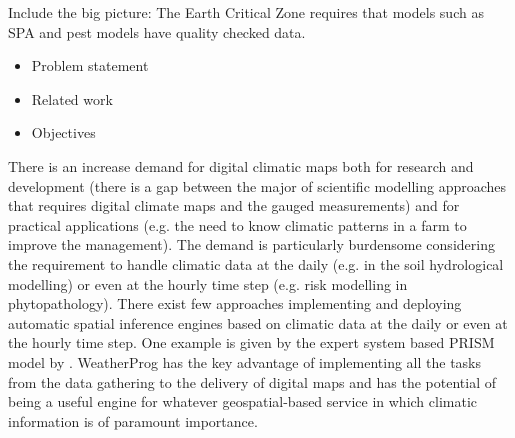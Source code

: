 \documentclass[authoryear,preprint,review,12pt]{elsarticle}
\begin{document}

Include the big picture:
The Earth Critical Zone requires that models such as SPA and pest models have quality checked data.


\begin{itemize}
    \item Problem statement
    \item Related work
    \item Objectives
\end{itemize}

There is an increase demand for digital climatic maps both for research and development (there is a gap between the major of scientific modelling approaches that requires digital climate maps and the gauged measurements) and for practical applications (e.g. the need to know climatic patterns in a farm to improve the management).
The demand is particularly burdensome considering the requirement to handle climatic data at the daily (e.g. in the soil hydrological modelling) or even at the hourly time step (e.g. risk modelling in phytopathology).
There exist few approaches implementing and deploying automatic spatial inference engines based on climatic data at the daily or even at the hourly time step.
One example is given by the expert system based PRISM model by \cite{Daly08_PRISM_USA}.
WeatherProg has the key advantage of implementing all the tasks from the data gathering to the delivery of digital maps and has the potential of being a useful engine for whatever geospatial-based service in which climatic information is of paramount importance.
\end{document}
